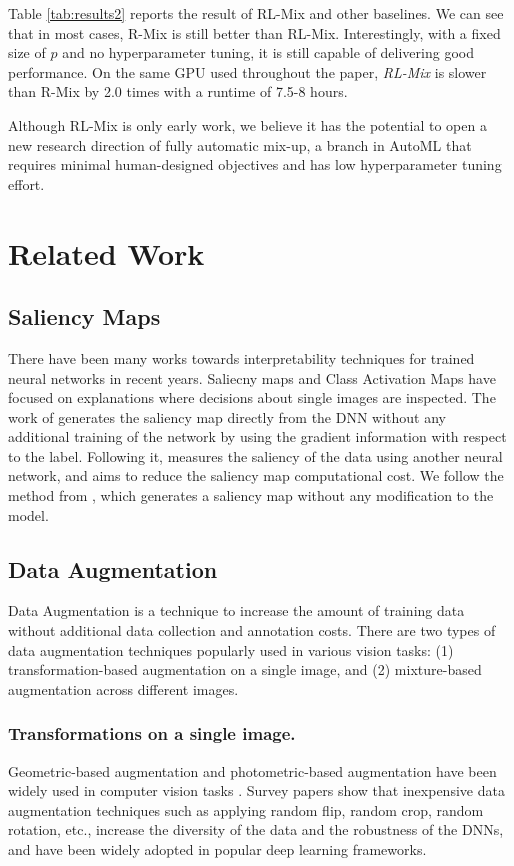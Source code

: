 \documentclass[letterpaper]{article} \usepackage[submission]{aaai23}  \usepackage{times}  \usepackage{helvet}  \usepackage{courier}  \usepackage[hyphens]{url}  \usepackage{graphicx} \urlstyle{rm} \def\UrlFont{\rm}  \usepackage{natbib}  \usepackage{caption} \frenchspacing  \setlength{\pdfpagewidth}{8.5in} \setlength{\pdfpageheight}{11in}
\newcommand{\rrlmix}{{R-Mix}}
\begin{document}
Table \ref{tab:results2} reports the result of RL-Mix and other baselines. We can see that in most cases, \rrlmix{} is still better than RL-Mix. Interestingly, with a fixed size of $p$ and no hyperparameter tuning, it is still capable of delivering good performance. On the same GPU used throughout the paper, \textit{RL-Mix} is slower than \rrlmix{} by 2.0 times with a runtime of 7.5-8 hours.

Although RL-Mix is only early work, we believe it has the potential to open a new research direction of fully automatic mix-up, a branch in AutoML that requires minimal human-designed objectives and has low hyperparameter tuning effort.


 
\section{Related Work}
\label{sec:related}
\subsection{Saliency Maps}
There have been many works towards interpretability techniques for trained neural networks in recent years. Saliecny maps \cite{simonyan2014sal} and Class Activation Maps \cite{zhou2015learning} have focused on explanations where decisions about single images are inspected.
The work of \cite{simonyan2014sal} generates the saliency map directly from the DNN without any additional training of the network by using the gradient information with respect to the label. Following it, \cite{zhao2015sal} measures the saliency of the data using another neural network, and \cite{Zhou2016sal} aims to reduce the saliency map computational cost. We follow the method from \cite{simonyan2014sal}, which generates a saliency map without any modification to the model.

\subsection{Data Augmentation}
Data Augmentation is a technique to increase the amount of training data without additional data collection and annotation costs. There are two types of data augmentation techniques popularly used in various vision tasks: (1) transformation-based augmentation on a single image, and (2) mixture-based augmentation across different images. 

\subsubsection{Transformations on a single image.} Geometric-based augmentation and photometric-based augmentation have been widely used in computer vision tasks \cite{devries2017improved,huang2020self,huang2020improving,huang2020comprehensive, huang2022two, wang2022toward, wang2020high}. Survey papers \cite{Halevy2009data, Sun2017data, Shorten2019DataAugSurvey} show that inexpensive data augmentation techniques such as applying random flip, random crop, random rotation, etc., increase the diversity of the data and the robustness of the DNNs, and have been widely adopted in popular deep learning frameworks.
\end{document}
